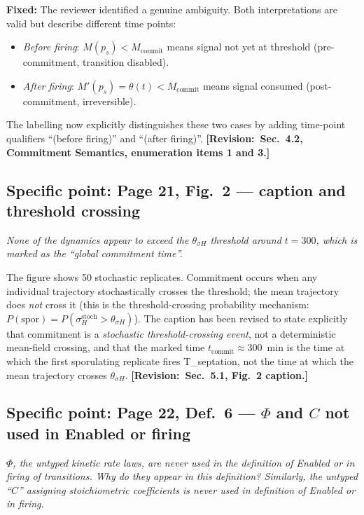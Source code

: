\documentclass[11pt,letterpaper]{article}
\newcommand{\rquote}[1]{\begin{mdframed}[style=reviewquote]\textit{#1}\end{mdframed}}
\newcommand{\sref}[1]{\textbf{[Revision:~#1]}}
\newcommand{\fixed}[1]{\textcolor{blue!70!black}{\textbf{Fixed:} #1}}
\begin{document}
\fixed{The reviewer identified a genuine ambiguity.
Both interpretations are valid but describe different time points:
\begin{itemize}
  \item \emph{Before firing}: $M(p_s) < M_{\mathrm{commit}}$ means signal not
    yet at threshold (pre-commitment, transition disabled).
  \item \emph{After firing}: $M'(p_s) = \theta(t) < M_{\mathrm{commit}}$ means
    signal consumed (post-commitment, irreversible).
\end{itemize}
The labelling now explicitly distinguishes these two cases by adding
time-point qualifiers ``(before firing)'' and ``(after firing)''.
\sref{Sec.~4.2, Commitment Semantics, enumeration items 1 and 3.}}

\subsection*{Specific point: Page 21, Fig.\ 2 --- caption and threshold crossing}

\rquote{None of the dynamics appear to exceed the $\theta_{\sigma H}$ threshold
around $t = 300$, which is marked as the ``global commitment time''.}

The figure shows 50 stochastic replicates.
Commitment occurs when any individual trajectory stochastically crosses the
threshold; the mean trajectory does \emph{not} cross it (this is the
threshold-crossing probability mechanism: $P(\mathrm{spor}) = P(\sigma_H^{\mathrm{stoch}}
> \theta_{\sigma H})$).
The caption has been revised to state explicitly that commitment is a
\emph{stochastic threshold-crossing event}, not a deterministic mean-field
crossing, and that the marked time $t_{\mathrm{commit}} \approx 300$~min is
the time at which the first sporulating replicate fires T\_septation,
not the time at which the mean trajectory crosses $\theta_{\sigma H}$.
\sref{Sec.~5.1, Fig.~2 caption.}

\subsection*{Specific point: Page 22, Def.\ 6 --- $\Phi$ and $C$ not used in
Enabled or firing}

\rquote{$\Phi$, the untyped kinetic rate laws, are never used in the definition
of Enabled or in firing of transitions. Why do they appear in this definition?
Similarly, the untyped ``$C$'' assigning stoichiometric coefficients is never
used in definition of Enabled or in firing.}
\end{document}
